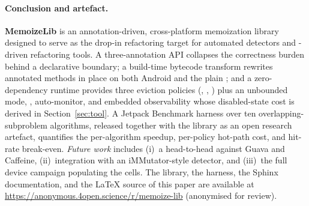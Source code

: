 \paragraph{Conclusion and artefact.}
\textbf{MemoizeLib} is an annotation-driven, cross-platform memoization library designed to serve as the drop-in refactoring target for automated detectors and \llm-driven refactoring tools. A three-annotation API collapses the correctness burden behind a declarative boundary; a build-time bytecode transform rewrites annotated methods in place on both Android and the plain \jvm; and a zero-dependency runtime provides three eviction policies (\lru, \fifo, \lfu) plus an unbounded mode, \ttl, auto-monitor, and embedded observability whose disabled-state cost is derived in Section~\ref{sec:tool}. A Jetpack Benchmark harness over ten overlapping-subproblem algorithms, released together with the library as an open research artefact, quantifies the per-algorithm speedup, per-policy hot-path cost, and hit-rate break-even. \emph{Future work} includes (i)~a head-to-head against Guava and Caffeine, (ii)~integration with an iMMutator-style detector, and (iii)~the full device campaign populating the \pending{} cells. The library, the harness, the Sphinx documentation, and the \LaTeX{} source of this paper are available at
\url{https://anonymous.4open.science/r/memoize-lib} (anonymised for review).
